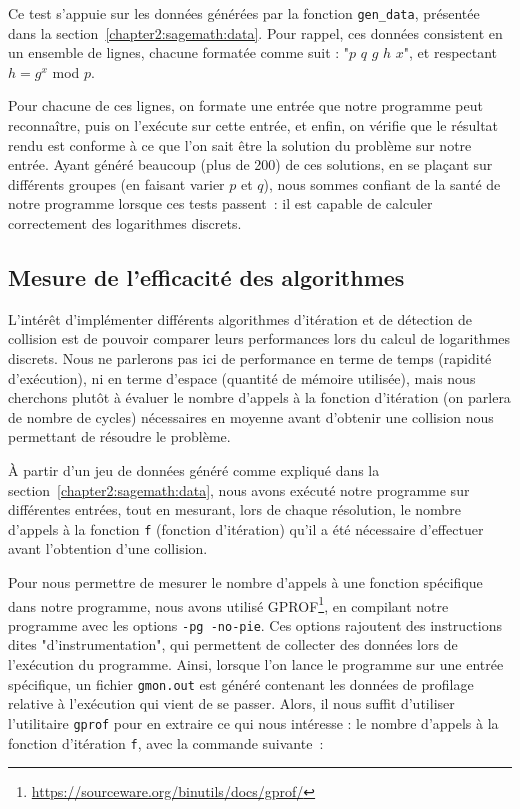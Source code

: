       Ce test s'appuie sur les données générées par la fonction \lstinline{gen_data}, présentée dans la section~\ref{chapter2:sagemath:data}. Pour rappel, ces données consistent en un ensemble de lignes, chacune formatée comme suit : "$p$ $q$ $g$ $h$ $x$", et respectant $h = g^x$ mod $p$.

      Pour chacune de ces lignes, on formate une entrée que notre programme peut reconnaître, puis on l'exécute sur cette entrée, et enfin, on vérifie que le résultat rendu est conforme à ce que l'on sait être la solution du problème sur notre entrée.
      Ayant généré beaucoup (plus de 200) de ces solutions, en se plaçant sur différents groupes (en faisant varier $p$ et $q$), nous sommes confiant de la santé de notre programme lorsque ces tests passent~: il est capable de calculer correctement des logarithmes discrets.


      \subsection{Mesure de l'efficacité des algorithmes}
      L'intérêt d'implémenter différents algorithmes d'itération et de détection de collision est de pouvoir comparer leurs performances lors du calcul de logarithmes discrets. Nous ne parlerons pas ici de performance en terme de temps (rapidité d'exécution), ni en terme d'espace (quantité de mémoire utilisée), mais nous cherchons plutôt à évaluer le nombre d'appels à la fonction d'itération (on parlera de nombre de cycles) nécessaires en moyenne avant d'obtenir une collision nous permettant de résoudre le problème.

      À partir d'un jeu de données généré comme expliqué dans la section~\ref{chapter2:sagemath:data}, nous avons exécuté notre programme sur différentes entrées, tout en mesurant, lors de chaque résolution, le nombre d'appels à la fonction \lstinline{f} (fonction d'itération) qu'il a été nécessaire d'effectuer avant l'obtention d'une collision.

      Pour nous permettre de mesurer le nombre d'appels à une fonction spécifique dans notre programme, nous avons utilisé GPROF\footnote{\url{https://sourceware.org/binutils/docs/gprof/}}, en compilant notre programme avec les options \lstinline{-pg -no-pie}. Ces options rajoutent des instructions dites "d'instrumentation", qui permettent de collecter des données lors de l'exécution du programme.
      Ainsi, lorsque l'on lance le programme sur une entrée spécifique, un fichier \lstinline{gmon.out} est généré contenant les données de profilage relative à l'exécution qui vient de se passer. Alors, il nous suffit d'utiliser l'utilitaire \lstinline{gprof} pour en extraire ce qui nous intéresse : le nombre d'appels à la fonction d'itération \lstinline{f}, avec la commande suivante~:

